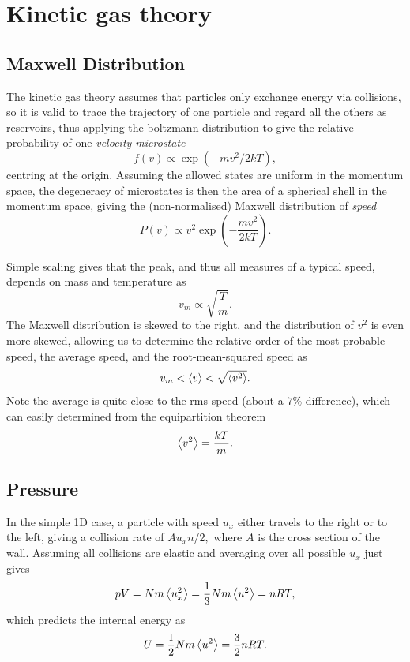 \documentclass{article}
\theoremstyle{nonumberplain}
\begin{document}
\section{Kinetic gas theory}
\subsection{Maxwell Distribution}
The kinetic gas theory assumes that particles only exchange energy via collisions, so it is valid to trace the trajectory of one particle and regard all the others as reservoirs, thus applying the boltzmann distribution to give the relative probability of one \textit{velocity microstate} 
\[
    f(v) \propto \exp(- m v^{2} / 2 k T), 
\]
centring at the origin. Assuming the allowed states are uniform in the momentum space, the degeneracy of microstates is then the area of a spherical shell in the momentum space, giving the (non-normalised) Maxwell distribution of \textit{speed}
\[
    \boxed{P(v) \propto v^2 \exp\left(- \frac{mv^{2} }{2 k T}\right).}
\]

Simple scaling gives that the peak, and thus all measures of a typical speed, depends on mass and temperature as
\[
    v_m \propto \sqrt{\frac{T}{m}}.  
\]
The Maxwell distribution is skewed to the right, and the distribution of $v^2$ is even more skewed, allowing us to determine the relative order of the most probable speed, the average speed, and the root-mean-squared speed as 
\[
    v_m < \expval{v} < \sqrt{\expval{v^2}}. 
\]
Note the average is quite close to the rms speed (about a $7\%$ difference), which can easily determined from the equipartition theorem
\[
    \expval{v^{2} } = \frac{k T }{m}. 
\]

\subsection{Pressure}
In the simple 1D case, a particle with speed $u_x$ either travels to the right or to the left, giving a collision rate of $A u_x n /2,$ where $A$ is the cross section of the wall. Assuming all collisions are elastic and averaging over all possible $u_x$ just gives
\[
    pV = N m \expval{u_x^2} = \frac{1}{3} N m \expval{u^2} = n R T,
\]
which predicts the internal energy as 
\[
    U =\frac{1}{2}N m \expval{u^2} = \frac{3}{2} n R T.
\]
\end{document}
